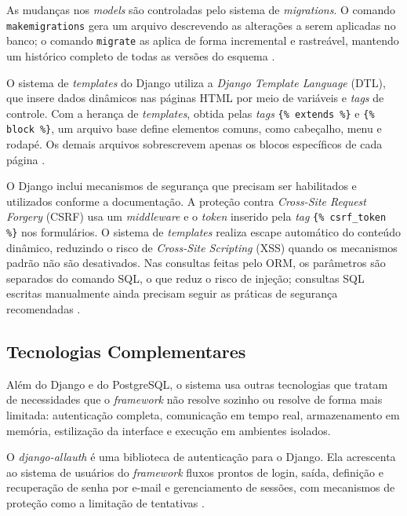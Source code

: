 As mudanças nos \textit{models} são controladas pelo sistema de \textit{migrations}. O comando \texttt{makemigrations} gera um arquivo descrevendo as alterações a serem aplicadas no banco; o comando \texttt{migrate} as aplica de forma incremental e rastreável, mantendo um histórico completo de todas as versões do esquema \cite{djangodocs}.

O sistema de \textit{templates} do Django utiliza a \textit{Django Template Language} (DTL), que insere dados dinâmicos nas páginas HTML por meio de variáveis e \textit{tags} de controle. Com a herança de \textit{templates}, obtida pelas \textit{tags} \texttt{\{\% extends \%\}} e \texttt{\{\% block \%\}}, um arquivo base define elementos comuns, como cabeçalho, menu e rodapé. Os demais arquivos sobrescrevem apenas os blocos específicos de cada página \cite{djangodocs}.

O Django inclui mecanismos de segurança que precisam ser habilitados e utilizados conforme a documentação. A proteção contra \textit{Cross-Site Request Forgery} (CSRF) usa um \textit{middleware} e o \textit{token} inserido pela \textit{tag} \texttt{\{\% csrf\_token \%\}} nos formulários. O sistema de \textit{templates} realiza escape automático do conteúdo dinâmico, reduzindo o risco de \textit{Cross-Site Scripting} (XSS) quando os mecanismos padrão não são desativados. Nas consultas feitas pelo ORM, os parâmetros são separados do comando SQL, o que reduz o risco de injeção; consultas SQL escritas manualmente ainda precisam seguir as práticas de segurança recomendadas \cite{djangodocs}.

\subsection{Tecnologias Complementares}
\label{sec:tecnologias}

Além do Django e do PostgreSQL, o sistema usa outras tecnologias que tratam de necessidades que o \textit{framework} não resolve sozinho ou resolve de forma mais limitada: autenticação completa, comunicação em tempo real, armazenamento em memória, estilização da interface e execução em ambientes isolados.

O \textit{django-allauth} é uma biblioteca de autenticação para o Django. Ela acrescenta ao sistema de usuários do \textit{framework} fluxos prontos de login, saída, definição e recuperação de senha por e-mail e gerenciamento de sessões, com mecanismos de proteção como a limitação de tentativas \cite{pennersr2024}.

